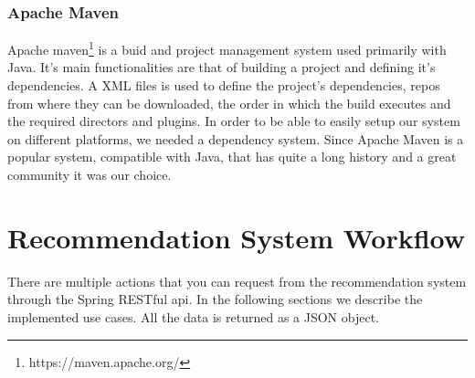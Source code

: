 \lstset{caption=Stanford Core NLP lemmatizer code, label=lst:stanford-core-nlp}


\subsubsection{Apache Maven}
\label{sec:frameworks-apache-maven}
Apache maven\footnote{https://maven.apache.org/} is a buid and project management system used primarily with Java. It's main functionalities are that of building a project and defining it's dependencies. A XML files is used to define the project's dependencies, repos from where they can be downloaded, the order in which the build executes and the required directors and plugins.
In order to be able to easily setup our system on different platforms, we needed a dependency system. Since Apache Maven is a popular system, compatible with Java, that has quite a long history and a great community it was our choice.

\section{Recommendation System Workflow} 
\label{sec:workflow}
There are multiple actions that you can request from the recommendation system through the Spring RESTful api.
In the following sections we describe the implemented use cases.
All the data is returned as a JSON object.

